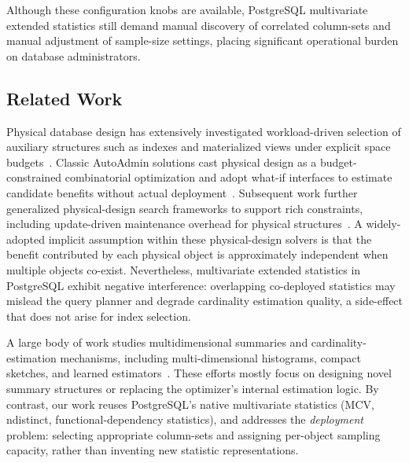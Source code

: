 \documentclass[sigconf, nonacm]{acmart}
\begin{document}
Although these configuration knobs are available, PostgreSQL multivariate
extended statistics still demand manual discovery of correlated column-sets and
manual adjustment of sample-size settings, placing significant operational
burden on database administrators.

\subsection{Related Work}

Physical database design has extensively investigated workload-driven selection
of auxiliary structures such as indexes and materialized views under explicit
space budgets~\cite{agrawal2000automated}. Classic AutoAdmin solutions cast
physical design as a budget-constrained combinatorial optimization and adopt
what-if interfaces to estimate candidate benefits without actual
deployment~\cite{chaudhuri1997efficient,chaudhuri1998autoadmin}. Subsequent work
further generalized physical-design search frameworks to support rich
constraints, including update-driven maintenance overhead for physical
structures~\cite{bruno2005automatic,bruno2010constrained}. A widely-adopted
implicit assumption within these physical-design solvers is that the benefit
contributed by each physical object is approximately independent when multiple
objects co-exist. Nevertheless, multivariate extended statistics in PostgreSQL
exhibit negative interference: overlapping co-deployed statistics may mislead
the query planner and degrade cardinality estimation quality, a side-effect
that does not arise for index selection.

A large body of work studies multidimensional summaries and
cardinality-estimation mechanisms, including multi-dimensional histograms,
compact sketches, and learned estimators~\cite{bruno2001stholes,negi2023robust,kipf2018learned}.
These efforts mostly focus on designing novel summary structures or replacing
the optimizer's internal estimation logic. By contrast, our work reuses
PostgreSQL's native multivariate statistics (MCV, ndistinct,
functional-dependency statistics), and addresses the \emph{deployment} problem:
selecting appropriate column-sets and assigning per-object sampling capacity,
rather than inventing new statistic representations.
\end{document}
